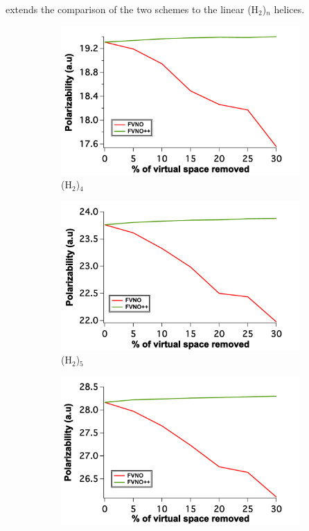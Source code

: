 extends the comparison of the two schemes to the linear (H$_2$)$_n$ helices.
\begin{figure}
\begin{subfigure}{.5\textwidth}
  \centering
  \includegraphics[width=.9\linewidth]{figures_fvno++/fvno++_h2_4_adz_polar.pdf}
  \caption{(H$_2$)$_4$}
  \label{fig:sfig1}
\end{subfigure}%
\begin{subfigure}{.5\textwidth}
  \centering
  \includegraphics[width=.9\linewidth]{figures_fvno++/fvno++_h2_5_adz_polar.pdf}
  \caption{(H$_2$)$_5$}
  \label{fig:sfig2}
\end{subfigure}
\begin{subfigure}{.5\textwidth}
  \centering
  \includegraphics[width=.9\linewidth]{figures_fvno++/fvno++_h2_6_adz_polar.pdf}

\end{subfigure}
\end{figure}
